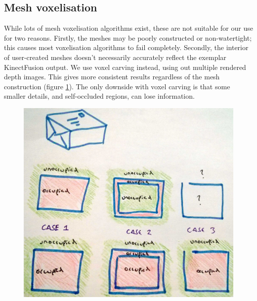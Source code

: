 \documentclass[10pt,a4paper, twocolumn]{article}
\begin{document}
\subsection{Mesh voxelisation}

While lots of mesh voxelisation algorithms exist, these are not suitable for our use for two reasons.
Firstly, the meshes may be poorly constructed or non-watertight; this causes most voxelisation algorithms to fail completely.
Secondly, the interior of user-created meshes doesn't necessarily accurately reflect the exemplar KinectFusion output.
We use voxel carving instead, using out multiple rendered depth images.
This gives more consistent results regardless of the mesh construction (figure \ref{fig:mesh_voxelisation_options}).
The only downside with voxel carving is that some smaller details, and self-occluded regions, can lose information.

\begin{figure}
	\centering%
	\includegraphics[width=1.0\linewidth]{mesh_voxelisation_options}%
	\label{fig:mesh_voxelisation_options}%
\end{figure}
\end{document}
